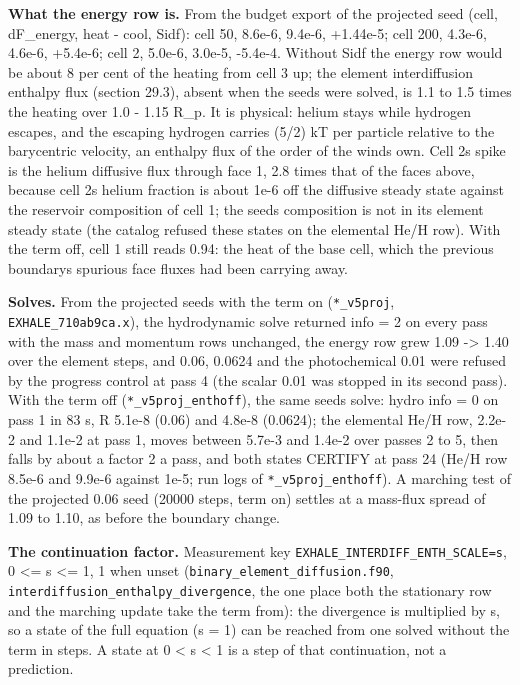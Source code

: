\documentclass[english,a4paper]{my_memo}
\begin{document}
\textbf{What the energy row is.} From the budget export of the projected seed
(cell, dF\_energy, heat - cool, Sidf): cell 50, 8.6e-6, 9.4e-6, +1.44e-5;
cell 200, 4.3e-6, 4.6e-6, +5.4e-6; cell 2, 5.0e-6, 3.0e-5, -5.4e-4. Without
Sidf the energy row would be about 8 per cent of the heating from cell 3 up;
the element interdiffusion enthalpy flux (section 29.3), absent when the
seeds were solved, is 1.1 to 1.5 times the heating over 1.0 - 1.15 R\_p. It is
physical: helium stays while hydrogen escapes, and the escaping hydrogen
carries (5/2) kT per particle relative to the barycentric velocity, an
enthalpy flux of the order of the wind\textquotesingle s own. Cell 2\textquotesingle s spike is the helium
diffusive flux through face 1, 2.8 times that of the faces above, because
cell 2\textquotesingle s helium fraction is about 1e-6 off the diffusive steady state
against the reservoir composition of cell 1; the seed\textquotesingle s composition is not
in its element steady state (the catalog refused these states on the
elemental He/H row). With the term off, cell 1 still reads 0.94: the heat of
the base cell, which the previous boundary\textquotesingle s spurious face fluxes had been
carrying away.

\textbf{Solves.} From the projected seeds with the term on (\texttt{*\_v5proj},
\texttt{EXHALE\_710ab9ca.x}), the hydrodynamic solve returned info = 2 on every
pass with the mass and momentum rows unchanged, the energy row grew 1.09 -\textgreater{}
1.40 over the element steps, and 0.06, 0.0624 and the photochemical 0.01
were refused by the progress control at pass 4 (the scalar 0.01 was stopped
in its second pass). With the term off (\texttt{*\_v5proj\_enthoff}), the same seeds
solve: hydro info = 0 on pass 1 in 83 s, \textbar\textbar R\textbar\textbar{} 5.1e-8 (0.06) and 4.8e-8
(0.0624); the elemental He/H row, 2.2e-2 and 1.1e-2 at pass 1, moves between
5.7e-3 and 1.4e-2 over passes 2 to 5, then falls by about a factor 2 a pass,
and both states CERTIFY at pass 24 (He/H row 8.5e-6 and 9.9e-6 against
1e-5; run logs of \texttt{*\_v5proj\_enthoff}). A marching test of the
projected 0.06 seed (20000 steps, term on) settles at a mass-flux spread of
1.09 to 1.10, as before the boundary change.

\textbf{The continuation factor.} Measurement key
\texttt{EXHALE\_INTERDIFF\_ENTH\_SCALE=s}, 0 \textless= s \textless= 1, 1 when unset
(\texttt{binary\_element\_diffusion.f90}, \texttt{interdiffusion\_enthalpy\_divergence}, the
one place both the stationary row and the marching update take the term
from): the divergence is multiplied by s, so a state of the full equation
(s = 1) can be reached from one solved without the term in steps. A state at
0 \textless{} s \textless{} 1 is a step of that continuation, not a prediction.
\end{document}
